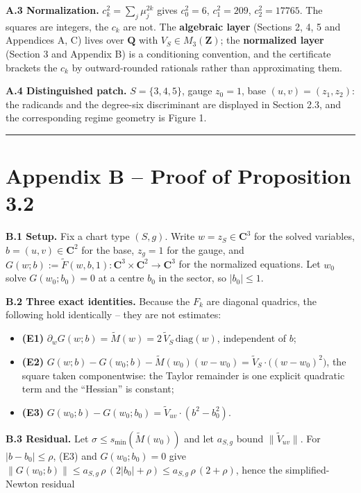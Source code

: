 \textbf{A.3 Normalization.} \(c_k^2 = \sum_j \mu_j^{2k}\) gives \(c_0^2 = 6\), \(c_1^2 = 209\), \(c_2^2 = 17765\). The squares are integers, the \(c_k\) are not. The \textbf{algebraic layer} (Sections 2, 4, 5 and Appendices A, C) lives over \(\mathbf{Q}\) with \(V_S \in M_3(\mathbf{Z})\); the \textbf{normalized layer} (Section 3 and Appendix B) is a conditioning convention, and the certificate brackets the \(c_k\) by outward-rounded rationals rather than approximating them.

\textbf{A.4 Distinguished patch.} \(S = \{3,4,5\}\), gauge \(z_0 = 1\), base \((u,v) = (z_1, z_2)\): the radicands and the degree-six discriminant are displayed in Section 2.3, and the corresponding regime geometry is Figure 1.

\begin{center}\rule{\linewidth}{0.5pt}\end{center}

\section{Appendix B -- Proof of Proposition 3.2}\label{appendix-b-proof-of-proposition-3.2}

\textbf{B.1 Setup.} Fix a chart type \((S, g)\). Write \(w = z_S \in \mathbf{C}^3\) for the solved variables, \(b = (u,v) \in \mathbf{C}^2\) for the base, \(z_g = 1\) for the gauge, and \(G(w; b) := \tilde F(w, b, 1) : \mathbf{C}^3 \times
\mathbf{C}^2 \to \mathbf{C}^3\) for the normalized equations. Let \(w_0\) solve \(G(w_0; b_0) = 0\) at a centre \(b_0\) in the sector, so \(|b_0| \le 1\).

\textbf{B.2 Three exact identities.} Because the \(F_k\) are diagonal quadrics, the following hold identically -- they are not estimates:

\begin{itemize}
\tightlist
\item
  \textbf{(E1)} \(\partial_w G(w; b) = \tilde M(w) = 2\, \tilde V_S \,
  \mathrm{diag}(w)\), independent of \(b\);
\item
  \textbf{(E2)} \(G(w; b) - G(w_0; b) - \tilde M(w_0)(w - w_0) =
  \tilde V_S \cdot \big((w - w_0)^2\big)\), the square taken componentwise: the Taylor remainder is one explicit quadratic term and the ``Hessian'' is constant;
\item
  \textbf{(E3)} \(G(w_0; b) - G(w_0; b_0) = \tilde V_{uv} \cdot (b^2 - b_0^2)\).
\end{itemize}

\textbf{B.3 Residual.} Let \(\sigma \le s_{\min}(\tilde M(w_0))\) and let \(a_{S,g}\) bound \(\lVert \tilde V_{uv} \rVert\). For \(|b - b_0| \le \rho\), (E3) and \(G(w_0;b_0) = 0\) give \(\lVert G(w_0; b) \rVert \le a_{S,g}\,\rho\,(2|b_0| +
\rho) \le a_{S,g}\,\rho\,(2 + \rho)\), hence the simplified-Newton residual

